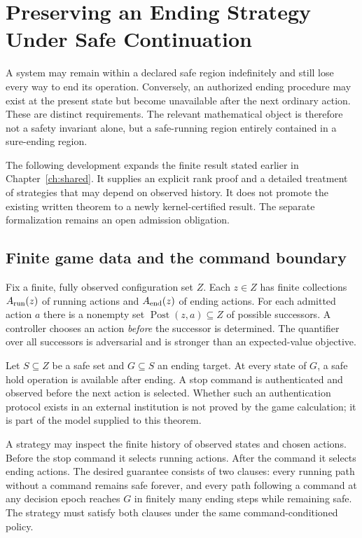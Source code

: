 \chapter{Preserving an Ending Strategy Under Safe Continuation}\label{ch:endinganalysis}

A system may remain within a declared safe region indefinitely and still lose every way to end its operation. Conversely, an authorized ending procedure may exist at the present state but become unavailable after the next ordinary action. These are distinct requirements. The relevant mathematical object is therefore not a safety invariant alone, but a safe-running region entirely contained in a sure-ending region.

The following development expands the finite result stated earlier in Chapter~\ref{ch:shared}. It supplies an explicit rank proof and a detailed treatment of strategies that may depend on observed history. It does not promote the existing written theorem to a newly kernel-certified result. The separate formalization remains an open admission obligation.

\section{Finite game data and the command boundary}
Fix a finite, fully observed configuration set $Z$. Each $z\in Z$ has finite collections $A_{\rm run}(z)$ of running actions and $A_{\rm end}(z)$ of ending actions. For each admitted action $a$ there is a nonempty set $\operatorname{Post}(z,a)\subseteq Z$ of possible successors. A controller chooses an action \emph{before} the successor is determined. The quantifier over all successors is adversarial and is stronger than an expected-value objective.

Let $S\subseteq Z$ be a safe set and $G\subseteq S$ an ending target. At every state of $G$, a safe hold operation is available after ending. A stop command is authenticated and observed before the next action is selected. Whether such an authentication protocol exists in an external institution is not proved by the game calculation; it is part of the model supplied to this theorem.

A strategy may inspect the finite history of observed states and chosen actions. Before the stop command it selects running actions. After the command it selects ending actions. The desired guarantee consists of two clauses: every running path without a command remains safe forever, and every path following a command at any decision epoch reaches $G$ in finitely many ending steps while remaining safe. The strategy must satisfy both clauses under the same command-conditioned policy.

